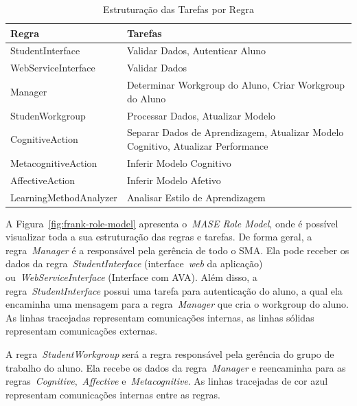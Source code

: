 \begin{table}
	\caption{Estruturação das Tarefas por Regra}
	\begin{tabular}{|p{5cm} | p{9cm}|}
		\hline
		\textbf{Regra}		& \textbf{Tarefas} \\
		\hline
		StudentInterface 	& Validar Dados, Autenticar Aluno  \\
		\hline
		WebServiceInterface 	& Validar Dados  \\
		\hline
		Manager 		& Determinar Workgroup do Aluno, Criar Workgroup do Aluno  \\ %
		\hline
		StudenWorkgroup 	& Processar Dados, Atualizar Modelo   \\
		\hline
		CognitiveAction 	& Separar Dados de Aprendizagem, Atualizar Modelo Cognitivo, Atualizar Performance  \\
		\hline
		MetacognitiveAction 	& Inferir Modelo Cognitivo  \\
		\hline
		AffectiveAction 	& Inferir Modelo Afetivo  \\
		\hline
		LearningMethodAnalyzer 	& Analisar Estilo de Aprendizagem  \\
		\hline
	\end{tabular}
	\label{tabela:mase-role-model}
\end{table}

A Figura~\ref{fig:frank-role-model} apresenta o~\emph{MASE Role Model}, onde é possível visualizar toda a sua estruturação das regras e tarefas. De forma geral, a regra~\emph{Manager} é a responsável pela gerência de todo o SMA. Ela pode receber os dados da regra~\emph{StudentInterface} (interface~\emph{web} da aplicação) ou~\emph{WebServiceInterface} (Interface com AVA). Além disso, a regra~\emph{StudentInterface} possui uma tarefa para autenticação do aluno, a qual ela encaminha uma mensagem para a regra~\emph{Manager} que cria o workgroup do aluno. As linhas tracejadas representam comunicações internas, as linhas sólidas representam comunicações externas.

A regra~\emph{StudentWorkgroup} será a regra responsável pela gerência do grupo de trabalho do aluno. Ela recebe os dados da regra~\emph{Manager} e reencaminha para as regras~\emph{Cognitive},~\emph{Affective} e~\emph{Metacognitive}. As linhas tracejadas de cor azul representam comunicações internas entre as regras.

